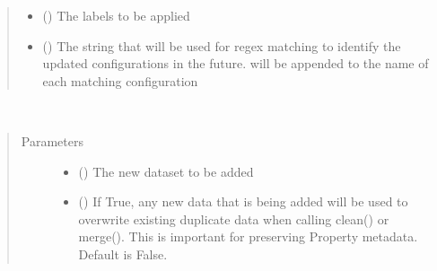 \documentclass[letterpaper,10pt,english]{sphinxmanual}
\begin{document}
\begin{fulllineitems}
\begin{fulllineitems}
\begin{quote}
\begin{description}
\begin{itemize}
\item {} 
\sphinxAtStartPar
{} () \textendash{} The labels to be applied

\item {} 
\sphinxAtStartPar
{} () \textendash{} The string that will be used for regex matching to identify
the updated configurations in the future.  will be
appended to the name of each matching configuration

\end{itemize}

\end{description}\end{quote}

\end{fulllineitems}


\begin{fulllineitems}
\label{\detokenize{dataset:colabfit.tools.dataset.Dataset.attach_dataset}}~\begin{quote}\begin{description}
\item[{Parameters}] \leavevmode\begin{itemize}
\item {} 
\sphinxAtStartPar
{} ({\hyperref[\detokenize{dataset:colabfit.tools.dataset.Dataset}]{}}) \textendash{} The new dataset to be added

\item {} 
\sphinxAtStartPar
{} () \textendash{} If True, any new data that is being added will be used to
overwrite existing duplicate data when calling clean() or
merge(). This is important for preserving Property metadata.
Default is False.


\end{itemize}
\end{description}
\end{quote}
\end{fulllineitems}
\end{fulllineitems}
\end{document}

